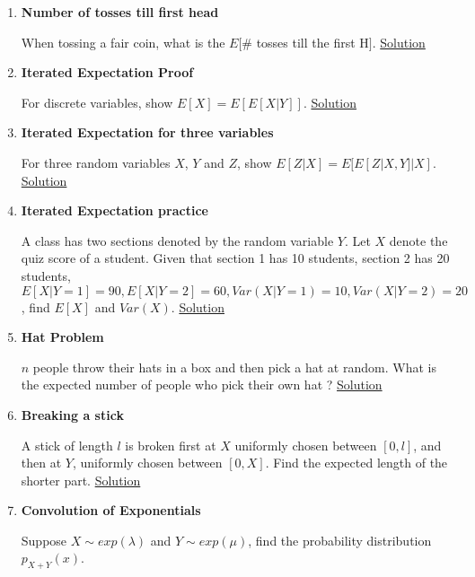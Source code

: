 \documentclass[../probability-notes.tex]{subfiles}
\begin{document}
\begin{enumerate}
    \item \hypertarget{q_tossh}{\textbf{Number of tosses till first head}}\newline
    When tossing a fair coin, what is the $E[$\# tosses till the first H$]$. \hyperlink{a_tossh}{Solution}

    \item \hypertarget{q_itrexpproof}{\textbf{Iterated Expectation Proof}}\newline
    For discrete variables, show $E[X] = E[E[X|Y]]$. \hyperlink{a_itrexpproof}{Solution}

    \item \hypertarget{q_itrexpthree}{\textbf{Iterated Expectation for three variables}}\newline
    For three random variables $X$, $Y$ and $Z$, show $E[Z|X] = E[E[Z|X,Y]|X]$. \hyperlink{a_itrexpthree}{Solution}

    \item \hypertarget{q_itrexppractice}{\textbf{Iterated Expectation practice}}\newline
    A class has two sections denoted by the random variable $Y$. Let $X$ denote the quiz score of a student. Given that section 1 has 10 students, section 2 has 20 students, $E[X|Y=1] = 90, E[X|Y=2] = 60, Var(X|Y=1) = 10, Var(X|Y=2) = 20$, find $E[X]$ and $Var(X)$. \hyperlink{a_itrexppractice}{Solution}

    \item \hypertarget{q_hatproblem}{\textbf{Hat Problem}}\newline
    $n$ people throw their hats in a box and then pick a hat at random. What is the expected number of people who pick their own hat ? \hyperlink{a_hatproblem}{Solution}

    \item \hypertarget{q_breakstick}{\textbf{Breaking a stick}}\newline
    A stick of length $l$ is broken first at $X$ uniformly chosen between $[0,l]$, and then at $Y$, uniformly chosen between $[0,X]$. Find the expected length of the shorter part. \hyperlink{a_breakstick}{Solution}


    \item \hypertarget{q_convexp}{\textbf{Convolution of Exponentials}}\newline
    Suppose $X \sim exp(\lambda)$ and $Y \sim exp(\mu)$, find the probability distribution $p_{X+Y}(x)$.



\end{enumerate}
\end{document}
